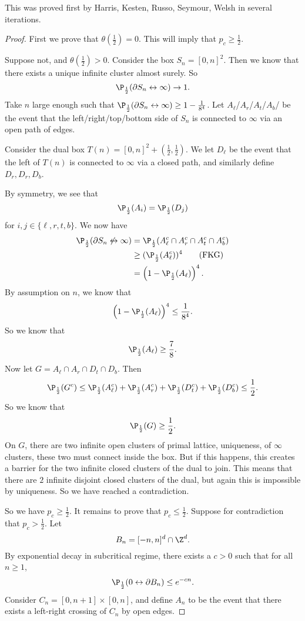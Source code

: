 \documentclass[a4paper]{article}
\begin{document}
This was proved first by Harris, Kesten, Russo, Seymour, Welsh in several iterations.
\begin{proof}
  First we prove that $\theta\left(\frac{1}{2}\right) = 0$. This will imply that $p_c \geq \frac{1}{2}$.

  Suppose not, and $\theta\left(\frac{1}{2}\right) > 0$. Consider the box $S_n = [0, n]^2$. Then we know that there exists a unique infinite cluster almost surely. So
  \[
    \P_{\frac{1}{2}}(\partial S_n \leftrightarrow \infty) \to 1.
  \]
  Take $n$ large enough such that $\P_{\frac{1}{2}} (\partial S_n \leftrightarrow \infty) \geq 1 - \frac{1}{8^4}$. Let $A_\ell$/$A_r$/$A_t$/$A_b$/ be the event that the left/right/top/bottom side of $S_n$ is connected to $\infty$ via an open path of edges.

  Consider the dual box $T(n) = [0, n]^2 + \left(\frac{1}{2}, \frac{1}{2}\right)$. We let $D_\ell$ be the event that the left of $T(n)$ is connected to $\infty$ via a closed path, and similarly define $D_r, D_r, D_b$.

  By symmetry, we see that
  \[
    \P_{\frac{1}{2}}(A_i) = \P_{\frac{1}{2}} (D_j)
  \]
  for $i, j \in \{\ell, r, t, b\}$. We now have
  \begin{align*}
    \P_{\frac{1}{2}}(\partial S_n \not\leftrightarrow \infty) &= \P_{\frac{1}{2}} (A_\ell^c \cap A_r^c \cap A_t^c \cap A_b^c)\\
    &\geq (\P_{\frac{1}{2}}(A_\ell^c))^4 \tag{FKG}\\
    &= \left(1 - \P_{\frac{1}{2}}(A_\ell)\right)^4.
  \end{align*}
  By assumption on $n$, we know that
  \[
    \left(1 - \P_{\frac{1}{2}}(A_\ell)\right)^{4} \leq \frac{1}{8^4}.
  \]
  So we know that
  \[
    \P_{\frac{1}{2}} (A_\ell) \geq \frac{7}{8}.
  \]
  Now let $G = A_\ell \cap A_r \cap D_t \cap D_b$. Then
  \[
    \P_{\frac{1}{2}} (G^c) \leq \P_{\frac{1}{2}}(A_\ell^c) + \P_{\frac{1}{2}}(A_r^c) + \P_{\frac{1}{2}}(D_t^c) + \P_{\frac{1}{2}}(D_b^c) \leq \frac{1}{2}.
  \]
  So we know that
  \[
    \P_{\frac{1}{2}}(G) \geq \frac{1}{2}.
  \]
  On $G$, there are two infinite open clusters of primal lattice, uniqueness, of $\infty$ clusters, these two must connect inside the box. But if this happens, this creates a barrier for the two infinite closed clusters of the dual to join. This means that there are $2$ infinite disjoint closed clusters of the dual, but again this is impossible by uniqueness. So we have reached a contradiction.

  So we have $p_c \geq \frac{1}{2}$. It remains to prove that $p_c \leq \frac{1}{2}$. Suppose for contradiction that $p_c > \frac{1}{2}$. Let
  \[
    B_n = [-n, n]^d \cap \Z^d.
  \]
  By exponential decay in subcritical regime, there exists a $c > 0$ such that for all $n \geq 1$,
  \[
    \P_{\frac{1}{2}}(0 \leftrightarrow \partial B_n) \leq e^{-cn}.
  \]
  Consider $C_n = [0, n + 1] \times [0, n]$, and define $A_n$ to be the event that there exists a left-right crossing of $C_n$ by open edges.


\end{proof}
\end{document}
